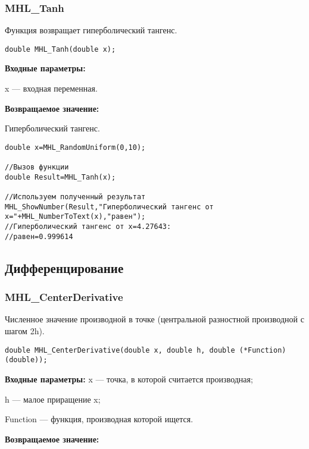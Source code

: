 \documentclass[a4paper,12pt]{article}
\begin{document}
\subsubsection{MHL\_Tanh}\label{MHL_Tanh}

Функция возвращает гиперболический тангенс.


\begin{lstlisting}[label=code_syntax_MHL_Tanh,caption=Синтаксис]
double MHL_Tanh(double x);
\end{lstlisting}

\textbf{Входные параметры:}

 x --- входная переменная.

\textbf{Возвращаемое значение:}

Гиперболический тангенс.


\begin{lstlisting}[label=code_use_MHL_Tanh,caption=Пример использования]
double x=MHL_RandomUniform(0,10);

//Вызов функции
double Result=MHL_Tanh(x);

//Используем полученный результат
MHL_ShowNumber(Result,"Гиперболический тангенс от x="+MHL_NumberToText(x),"равен");
//Гиперболический тангенс от x=4.27643:
//равен=0.999614
\end{lstlisting}

\subsection{Дифференцирование}

\subsubsection{MHL\_CenterDerivative}\label{MHL_CenterDerivative}

Численное значение производной в точке (центральной разностной производной с шагом 2h).


\begin{lstlisting}[label=code_syntax_MHL_CenterDerivative,caption=Синтаксис]
double MHL_CenterDerivative(double x, double h, double (*Function)(double));
\end{lstlisting}

\textbf{Входные параметры:}
 x --- точка, в которой считается производная;
 
 h --- малое приращение x;
 
 Function --- функция, производная которой ищется.

\textbf{Возвращаемое значение:}
 
\end{document}
